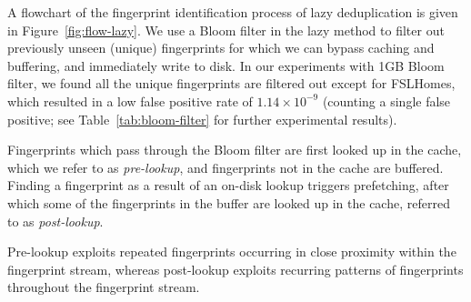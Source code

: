\documentclass[prodmode,acmtecs]{acmsmall}
\begin{document}
A flowchart of the fingerprint identification process of lazy deduplication is given in Figure~\ref{fig:flow-lazy}.  We use a Bloom filter in the lazy method to filter out previously unseen (unique) fingerprints for which we can bypass caching and buffering, and immediately write to disk. In our experiments with 1GB Bloom filter, we found all the unique fingerprints are filtered out except for FSLHomes, which resulted in a low false positive rate of $1.14\times 10^{-9}$ (counting a single false positive; see Table~\ref{tab:bloom-filter} for further experimental results).

Fingerprints which pass through the Bloom filter are first looked up in the cache, which we refer to as \emph{pre-lookup}, and fingerprints not in the cache are buffered.  Finding a fingerprint as a result of an on-disk lookup triggers prefetching, after which some of the fingerprints in the buffer are looked up in the cache, referred to as \emph{post-lookup}.

Pre-lookup exploits repeated fingerprints occurring in close proximity within the fingerprint stream, whereas post-lookup exploits recurring patterns of fingerprints throughout the fingerprint stream.
\end{document}
